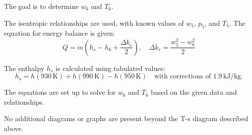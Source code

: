 The goal is to determine \( w_6 \) and \( T_6 \).  

The isentropic relationships are used, with known values of \( w_5 \), \( p_5 \), and \( T_5 \). The equation for energy balance is given:  
\[
Q = \dot{m} \left( h_s - h_6 + \frac{\Delta k_e}{2} \right), \quad \Delta k_e = \frac{w_5^2 - w_6^2}{2}
\]  

The enthalpy \( h_s \) is calculated using tabulated values:  
\[
h_s = h(930 \, \text{K}) + h(990 \, \text{K}) - h(950 \, \text{K}) \quad \text{with corrections of } 1.9 \, \text{kJ/kg}.
\]  

The equations are set up to solve for \( w_6 \) and \( T_6 \) based on the given data and relationships.  

No additional diagrams or graphs are present beyond the T-s diagram described above.